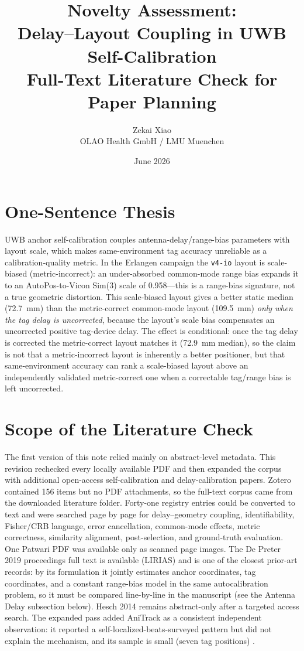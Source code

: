 \documentclass[11pt,a4paper]{article}
\title{Novelty Assessment:\\
       Delay--Layout Coupling in UWB Self-Calibration\\[5pt]
       \large Full-Text Literature Check for Paper Planning}
\author{Zekai Xiao\\
        OLAO Health GmbH / LMU Muenchen}
\date{June 2026}
\begin{document}
\maketitle

\section{One-Sentence Thesis}

UWB anchor self-calibration couples antenna-delay/range-bias parameters with layout scale, which makes same-environment tag accuracy unreliable as a calibration-quality metric. In the Erlangen campaign the \texttt{v4-io} layout is scale-biased (metric-incorrect): an under-absorbed common-mode range bias expands it to an AutoPos-to-Vicon Sim(3) scale of 0.958---this is a range-bias signature, not a true geometric distortion. This scale-biased layout gives a better static median (72.7~mm) than the metric-correct common-mode layout (109.5~mm) \emph{only when the tag delay is uncorrected}, because the layout's scale bias compensates an uncorrected positive tag-device delay. The effect is conditional: once the tag delay is corrected the metric-correct layout matches it (72.9~mm median), so the claim is not that a metric-incorrect layout is inherently a better positioner, but that same-environment accuracy can rank a scale-biased layout above an independently validated metric-correct one when a correctable tag/range bias is left uncorrected.

\section{Scope of the Literature Check}

The first version of this note relied mainly on abstract-level metadata. This revision rechecked every locally available PDF and then expanded the corpus with additional open-access self-calibration and delay-calibration papers. Zotero contained 156 items but no PDF attachments, so the full-text corpus came from the downloaded literature folder. Forty-one registry entries could be converted to text and were searched page by page for delay--geometry coupling, identifiability, Fisher/CRB language, error cancellation, common-mode effects, metric correctness, similarity alignment, post-selection, and ground-truth evaluation. One Patwari PDF was available only as scanned page images. The De Preter 2019 proceedings full text is available (LIRIAS) and is one of the closest prior-art records: by its formulation it jointly estimates anchor coordinates, tag coordinates, and a constant range-bias model in the same autocalibration problem, so it must be compared line-by-line in the manuscript (see the Antenna Delay subsection below). Hesch 2014 remains abstract-only after a targeted access search. The expanded pass added AniTrack as a consistent independent observation: it reported a self-localized-beats-surveyed pattern but did not explain the mechanism, and its sample is small (seven tag positions) \citep{luder_2025_anitrack}.
\end{document}

